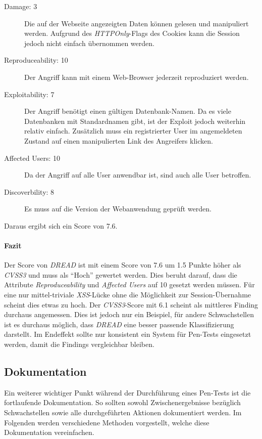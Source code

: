 	\begin{description}
		\item[Damage: 3] Die auf der Webseite angezeigten Daten können gelesen und manipuliert werden. Aufgrund des \textit{HTTPOnly}-Flags des Cookies kann die Session jedoch nicht einfach übernommen werden.
		\item[Reproduceability: 10] Der Angriff kann mit einem Web-Browser jederzeit reproduziert werden.
		\item[Exploitability: 7] Der Angriff benötigt einen gültigen Datenbank-Namen. Da es viele Datenbanken mit Standardnamen gibt, ist der Exploit jedoch weiterhin relativ einfach. Zusätzlich muss ein registrierter User im angemeldeten Zustand auf einen manipulierten Link des Angreifers klicken.
		\item[Affected Users: 10] Da der Angriff auf alle User anwendbar ist, sind auch alle User betroffen.
		\item[Discoverbility: 8] Es muss auf die Version der Webanwendung geprüft werden.
	\end{description}
	
	Daraus ergibt sich ein Score von 7.6.
	
	\paragraph{Fazit}
	Der Score von \textit{DREAD} ist mit einem Score von 7.6 um 1.5 Punkte höher als \textit{CVSS3} und muss als "`Hoch"' gewertet werden. Dies beruht darauf, dass die Attribute \textit{Reproduceability} und \textit{Affected Users} auf 10 gesetzt werden müssen. Für eine nur mittel-triviale \textit{XSS}-Lücke ohne die Möglichkeit zur Session-Übernahme scheint dies etwas zu hoch. Der \textit{CVSS3}-Score mit 6.1 scheint als mittleres Finding durchaus angemessen. Dies ist jedoch nur ein Beispiel, für andere Schwachstellen ist es durchaus möglich, dass \textit{DREAD} eine besser passende Klassifizierung darstellt. Im Endeffekt sollte nur konsistent ein System für Pen-Tests eingesetzt werden, damit die Findings vergleichbar bleiben.
			
	\subsection{Dokumentation}
	Ein weiterer wichtiger Punkt während der Durchführung eines Pen-Tests ist die fortlaufende Dokumentation. So sollten sowohl Zwischenergebnisse bezüglich Schwachstellen sowie alle durchgeführten Aktionen dokumentiert werden. Im Folgenden werden verschiedene Methoden vorgestellt, welche diese Dokumentation vereinfachen.
	
